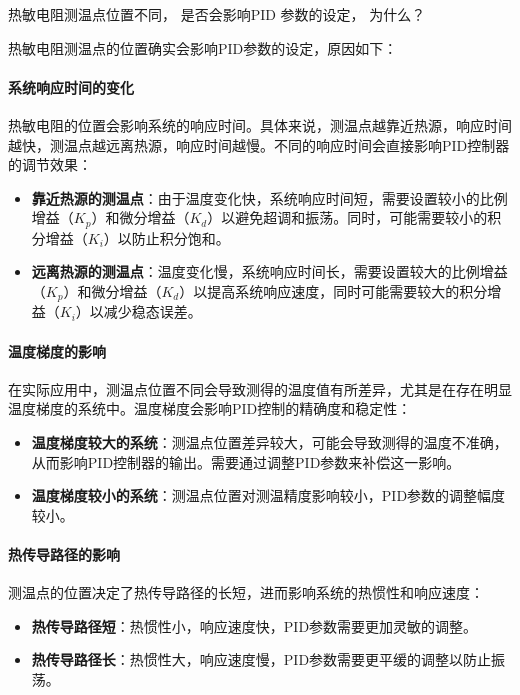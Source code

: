 \documentclass[dvipsnames, svgnames,a4paper,11pt]{article}
\begin{document}
\begin{question}
	热敏电阻测温点位置不同， 是否会影响PID 参数的设定， 为什么？
\end{question}


热敏电阻测温点的位置确实会影响PID参数的设定，原因如下：

\paragraph*{系统响应时间的变化}

热敏电阻的位置会影响系统的响应时间。具体来说，测温点越靠近热源，响应时间越快，测温点越远离热源，响应时间越慢。不同的响应时间会直接影响PID控制器的调节效果：

\begin{itemize}
    \item \textbf{靠近热源的测温点}：由于温度变化快，系统响应时间短，需要设置较小的比例增益（$K_p$）和微分增益（$K_d$）以避免超调和振荡。同时，可能需要较小的积分增益（$K_i$）以防止积分饱和。
    \item \textbf{远离热源的测温点}：温度变化慢，系统响应时间长，需要设置较大的比例增益（$K_p$）和微分增益（$K_d$）以提高系统响应速度，同时可能需要较大的积分增益（$K_i$）以减少稳态误差。
\end{itemize}

\paragraph*{温度梯度的影响}

在实际应用中，测温点位置不同会导致测得的温度值有所差异，尤其是在存在明显温度梯度的系统中。温度梯度会影响PID控制的精确度和稳定性：

\begin{itemize}
    \item \textbf{温度梯度较大的系统}：测温点位置差异较大，可能会导致测得的温度不准确，从而影响PID控制器的输出。需要通过调整PID参数来补偿这一影响。
    \item \textbf{温度梯度较小的系统}：测温点位置对测温精度影响较小，PID参数的调整幅度较小。
\end{itemize}

\paragraph*{热传导路径的影响}

测温点的位置决定了热传导路径的长短，进而影响系统的热惯性和响应速度：

\begin{itemize}
    \item \textbf{热传导路径短}：热惯性小，响应速度快，PID参数需要更加灵敏的调整。
    \item \textbf{热传导路径长}：热惯性大，响应速度慢，PID参数需要更平缓的调整以防止振荡。
\end{itemize}
\end{document}
